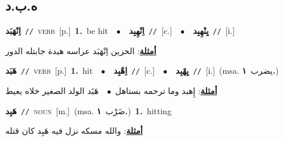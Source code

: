 \documentclass[10pt,a4paper,twoside]{article} %
\begin{document}
\begin{multicols}{2}
\vspace{-3mm}
\subsection*{\color{blue}\foreignlanguage{arabic}{ه.ب.د}\color{blue}{}} 

{\setlength\topsep{0pt}\textbf{\foreignlanguage{arabic}{اِنْهَبَد}}\ {\color{gray}\texttt{//}\color{black}}\ \textsc{verb}\ [p.]\ \textbf{1.}~be hit\ \ $\bullet$\ \ \setlength\topsep{0pt}\textbf{\foreignlanguage{arabic}{اِنْهِبِد}}\ {\color{gray}\texttt{//}\color{black}}\ [c.]\ \ $\bullet$\ \ \setlength\topsep{0pt}\textbf{\foreignlanguage{arabic}{يِنْهِبِد}}\ {\color{gray}\texttt{//}\color{black}}\ [i.]\  \begin{flushright}\color{gray}\foreignlanguage{arabic}{\textbf{\underline{\foreignlanguage{arabic}{أمثلة}}}: الحزين اِنْهَبَد عراسه هبدة جابتله الدور}\end{flushright}\color{black}} \vspace{2mm}

{\setlength\topsep{0pt}\textbf{\foreignlanguage{arabic}{هَبَد}}\ {\color{gray}\texttt{//}\color{black}}\ \textsc{verb}\ [p.]\ \textbf{1.}~hit\ \ $\bullet$\ \ \setlength\topsep{0pt}\textbf{\foreignlanguage{arabic}{اِهْبِد}}\ {\color{gray}\texttt{//}\color{black}}\ [c.]\ \ $\bullet$\ \ \setlength\topsep{0pt}\textbf{\foreignlanguage{arabic}{يِهْبِد}}\ {\color{gray}\texttt{//}\color{black}}\ [i.]\ \color{gray}(msa. \foreignlanguage{arabic}{يضرب}~\foreignlanguage{arabic}{\textbf{١.}})\color{black}\  \begin{flushright}\color{gray}\foreignlanguage{arabic}{\textbf{\underline{\foreignlanguage{arabic}{أمثلة}}}: إِهبد وما ترحمه بستاهل\ $\bullet$\ \  هَبََد الولد الصغير خلاه يعيط}\end{flushright}\color{black}} \vspace{2mm}

{\setlength\topsep{0pt}\textbf{\foreignlanguage{arabic}{هَبِد}}\ {\color{gray}\texttt{//}\color{black}}\ \textsc{noun}\ [m.]\ \color{gray}(msa. \foreignlanguage{arabic}{ضَرْب}~\foreignlanguage{arabic}{\textbf{١.}})\color{black}\ \textbf{1.}~hitting\  \begin{flushright}\color{gray}\foreignlanguage{arabic}{\textbf{\underline{\foreignlanguage{arabic}{أمثلة}}}: والله مسكه نزل فيه هَبِد كان قتله}\end{flushright}\color{black}} \vspace{2mm}


\end{multicols}
\end{document}
